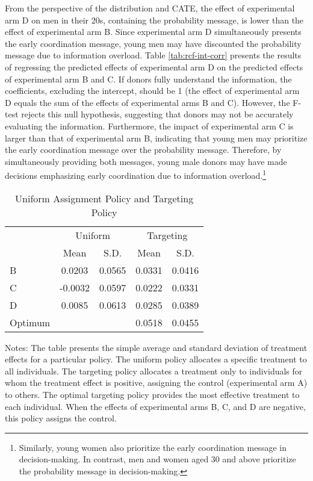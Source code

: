 \documentclass[
  11pt,
  a4paper
]{article}
\begin{document}
From the perspective of the distribution and CATE, the effect of experimental arm D on men in their 20s, containing the probability message, is lower than the effect of experimental arm B. Since experimental arm D simultaneously presents the early coordination message, young men may have discounted the probability message due to information overload. Table \ref{tab:rcf-int-corr} presents the results of regressing the predicted effects of experimental arm D on the predicted effects of experimental arm B and C. If donors fully understand the information, the coefficients, excluding the intercept, should be 1 (the effect of experimental arm D equals the sum of the effects of experimental arms B and C). However, the F-test rejects this null hypothesis, suggesting that donors may not be accurately evaluating the information. Furthermore, the impact of experimental arm C is larger than that of experimental arm B, indicating that young men may prioritize the early coordination message over the probability message. Therefore, by simultaneously providing both messages, young male donors may have made decisions emphasizing early coordination due to information overload.\footnote{Similarly, young women also prioritize the early coordination message in decision-making. In contrast, men and women aged 30 and above prioritize the probability message in decision-making.}

\begin{table}

\caption{\label{tab:targeting-effect}Uniform Assignment Policy and Targeting Policy}
\centering
\fontsize{9}{11}\selectfont
\begin{threeparttable}
\begin{tabular}[t]{lcccc}
\toprule
\multicolumn{1}{c}{ } & \multicolumn{2}{c}{Uniform} & \multicolumn{2}{c}{Targeting} \\
\cmidrule(l{3pt}r{3pt}){2-3} \cmidrule(l{3pt}r{3pt}){4-5}
 & Mean & S.D. & Mean & S.D.\\
\midrule
B & 0.0203 & 0.0565 & 0.0331 & 0.0416\\
C & -0.0032 & 0.0597 & 0.0222 & 0.0331\\
D & 0.0085 & 0.0613 & 0.0285 & 0.0389\\
Optimum &  &  & 0.0518 & 0.0455\\
\bottomrule
\end{tabular}
\begin{tablenotes}
\item Notes: The table presents the simple average and standard deviation of treatment effects for a particular policy. The uniform policy allocates a specific treatment to all individuals. The targeting policy allocates a treatment only to individuals for whom the treatment effect is positive, assigning the control (experimental arm A) to others. The optimal targeting policy provides the most effective treatment to each individual. When the effects of experimental arms B, C, and D are negative, this policy assigns the control.
\end{tablenotes}
\end{threeparttable}
\end{table}
\end{document}
